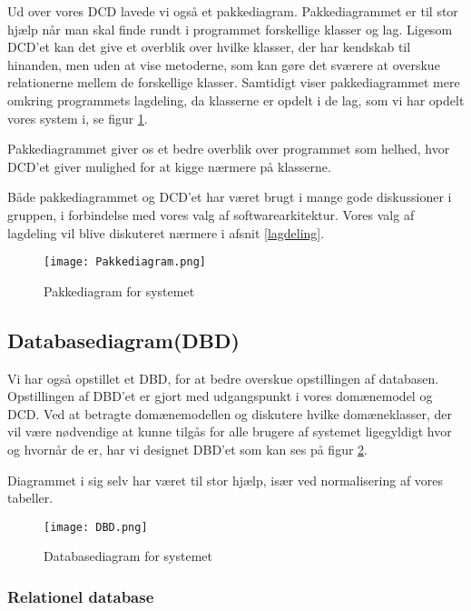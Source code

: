 Ud over vores DCD lavede vi også et pakkediagram.
Pakkediagrammet er til stor hjælp når man skal finde rundt i programmet forskellige klasser og lag.
Ligesom DCD'et kan det give et overblik over hvilke klasser, der har kendskab til hinanden, men uden at vise metoderne, som kan gøre det sværere at overskue relationerne mellem de forskellige klasser.
Samtidigt viser pakkediagrammet mere omkring programmets lagdeling, da klasserne er opdelt i de lag, som vi har opdelt vores system i, se figur \ref{fig:pakkediagram}.

Pakkediagrammet giver os et bedre overblik over programmet som helhed, hvor DCD'et giver mulighed for at kigge nærmere på klasserne.

Både pakkediagrammet og DCD'et har været brugt i mange gode diskussioner i gruppen, i forbindelse med vores valg af softwarearkitektur.
Vores valg af lagdeling vil blive diskuteret nærmere i afsnit \ref{lagdeling}.

\begin{figure}[H]
    \caption{Pakkediagram for systemet}
    \centering
        \texttt{[image: Pakkediagram.png]}
    \label{fig:pakkediagram}
\end{figure}

\subsection{Databasediagram(DBD)}
\label{DBD}

Vi har også opstillet et DBD, for at bedre overskue opstillingen af databasen.
Opstillingen af DBD'et er gjort med udgangspunkt i vores domænemodel og DCD.
Ved at betragte domænemodellen og diskutere hvilke domæneklasser, der vil være nødvendige at kunne tilgås for alle brugere af systemet ligegyldigt hvor og hvornår de er, har vi designet DBD'et som kan ses på figur \ref{fig:DBD}.

Diagrammet i sig selv har været til stor hjælp, især ved normalisering af vores tabeller. 

\begin{figure}[H]
    \caption{Databasediagram for systemet}
    \centering
        \texttt{[image: DBD.png]}
    \label{fig:DBD}
\end{figure}

\subsubsection{Relationel database}

